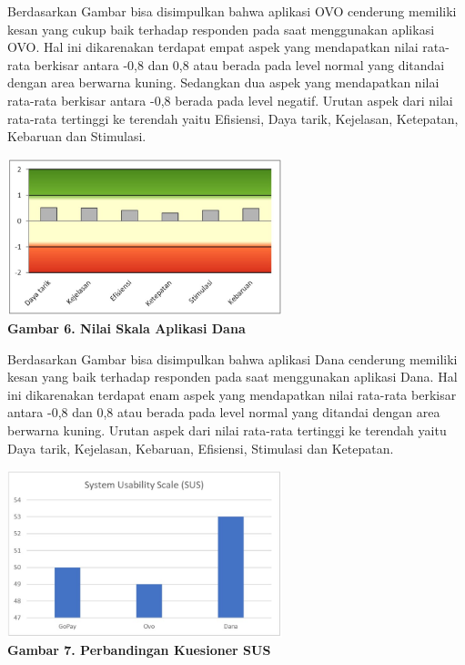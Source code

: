\documentclass[
 manuscript=article,  %
  layout=publish, 
  year=2024, 
  month= Februari, %
  volume=8,
  number=1 
]{JIKO}
\begin{document}
Berdasarkan Gambar  bisa disimpulkan bahwa aplikasi OVO cenderung memiliki kesan yang cukup baik terhadap responden pada saat menggunakan aplikasi OVO. Hal ini dikarenakan terdapat empat aspek yang mendapatkan nilai rata-rata berkisar antara -0,8 dan 0,8 atau berada pada level normal yang ditandai dengan area berwarna kuning. Sedangkan dua aspek yang mendapatkan nilai rata-rata berkisar antara -0,8 berada pada level negatif. Urutan aspek dari nilai rata-rata tertinggi ke terendah yaitu Efisiensi, Daya tarik, Kejelasan, Ketepatan, Kebaruan dan Stimulasi. 
\begin{center}
    \includegraphics[width=0.6\textwidth]{assets/gambar6.jpg}
    \\\textbf{Gambar 6. Nilai Skala Aplikasi Dana}
\end{center}


Berdasarkan Gambar  bisa disimpulkan bahwa aplikasi Dana cenderung memiliki kesan yang baik terhadap responden pada saat menggunakan aplikasi Dana. Hal ini dikarenakan terdapat enam aspek yang mendapatkan nilai rata-rata berkisar antara -0,8 dan 0,8 atau berada pada level normal yang ditandai dengan area berwarna kuning. Urutan aspek dari nilai rata-rata tertinggi ke terendah yaitu Daya tarik, Kejelasan, Kebaruan, Efisiensi, Stimulasi dan Ketepatan.
\begin{center}
    \includegraphics[width=0.6\textwidth]{assets/gambar7.jpg}
    \\\textbf{Gambar 7. Perbandingan Kuesioner SUS}
\end{center}
\end{document}
